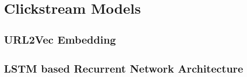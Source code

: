 \section{Clickstream Models}

\subsection{URL2Vec Embedding}

\subsection{LSTM based Recurrent Network Architecture}


\cleardoublepage